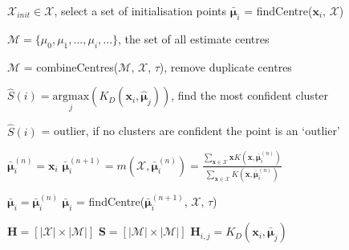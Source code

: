 \documentclass[../thesis.tex]{subfiles}
\begin{document}
\begin{algorithm}
\caption{The DMS Algorithm}\label{alg__DMS__DMS}

\begin{algorithmic}
\State ${\mathcal{X}}_{init} \in \mathcal{X}$, select a set of initialisation points 
    \State $\bar{\boldsymbol{\mu}}_i$ = findCentre($\mathbf{x}_i$, $\mathcal{X}$)

\EndFor
\State $\mathcal{M} = \{\mu_0, \mu_1, ..., \mu_i, ...\}$, the set of all estimate centres


\State $\mathcal{M}$ = combineCentres($\mathcal{M}$, $\mathcal{X}$, $\tau$), remove duplicate centres



    \State $\hat{S}(i) = \underset{j}{\mathrm{argmax}} 
       (K_D(\mathbf{x}_i, \hat{\boldsymbol{\mu}}_j))$, find the most confident cluster

    
        \State $\hat{S}(i)$ = outlier, if no clusters are confident the point is an `outlier'
    \EndIf
\EndFor

\EndFunction
\item[]

\State $\bar{\boldsymbol{\mu}}^{(n)}_i = \mathbf{x}_i$
\State$    \bar {\boldsymbol{\mu}}^{(n+1)}_i = m(\mathcal{X}, \bar {\boldsymbol{\mu}}^{(n)}_i) = \frac{\sum_{\mathbf x \in \mathcal X} \mathbf x K(\mathbf x, \bar {\boldsymbol{\mu}}^{(n)}_i) }{\sum_{\mathbf x \in \mathcal X} K(\mathbf x, \bar{\boldsymbol{\mu}}^{(n)}_i)}$

    \State $\bar{\boldsymbol{\mu}}_i = \bar{\boldsymbol{\mu}}^{(n)}_i$
\Else
    \State $\bar{\boldsymbol{\mu}}_i$ = findCentre($\bar {\boldsymbol{\mu}}^{(n+1)}_i$, $\mathcal{X}$, $\tau$)
\EndIf

\EndFunction



\item[]

\State $\mathbf{H} = [|\mathcal{X}| \times |\mathcal{M}|]$
\State $\mathbf{S} = [|\mathcal{M}|\times |\mathcal{M}|]$
        \State $\mathbf{H}_{i,j}=K_D(\mathbf{x}_i, \bar{\boldsymbol{\mu}}_j)$
    \EndFor
\EndFor


\end{algorithmic}
\end{algorithm}
\end{document}
